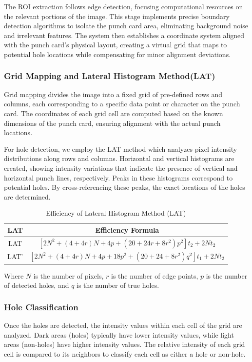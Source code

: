 The ROI extraction follows edge detection, focusing computational resources on the relevant portions of the image. This stage implements precise boundary detection algorithms to isolate the punch card area, eliminating background noise and irrelevant features. The system then establishes a coordinate system aligned with the punch card's physical layout, creating a virtual grid that maps to potential hole locations while compensating for minor alignment deviations.

\subsubsection{Grid Mapping and Lateral Histogram Method(LAT)}

Grid mapping divides the image into a fixed grid of pre-defined rows and columns, each corresponding to a specific data point or character on the punch card. The coordinates of each grid cell are computed based on the known dimensions of the punch card, ensuring alignment with the actual punch locations.

For hole detection, we employ the LAT method which analyzes pixel intensity distributions along rows and columns. Horizontal and vertical histograms are created, showing intensity variations that indicate the presence of vertical and horizontal punch lines, respectively. Peaks in these histograms correspond to potential holes. By cross-referencing these peaks, the exact locations of the holes are determined.

\begin{table}[h!]
    \centering
    \caption{Efficiency of Lateral Histogram Method (LAT)}
    \label{tab:lat_efficiency}
    \begin{tabular}{|c|c|}
        \hline
        LAT & Efficiency Formula \\
        \hline
        LAT & \([2N^2 + (4+4r)N + 4p + (20+24r+8r^2)p^2] t_2 + 2Nt_2\) \\
        LAT' & \([2N^2 + (4+4r)N + 4p + 18p^2 + (20 + 24 + 8r^2)q^2] t_1 + 2Nt_2\) \\
        \hline
    \end{tabular}
\end{table}

Where \(N\) is the number of pixels, \(r\) is the number of edge points, \(p\) is the number of detected holes, and \(q\) is the number of true holes.

\subsubsection{Hole Classification}
Once the holes are detected, the intensity values within each cell of the grid are analyzed. Dark areas (holes) typically have lower intensity values, while light areas (non-holes) have higher intensity values. The relative intensity of each grid cell is compared to its neighbors to classify each cell as either a hole or non-hole.

